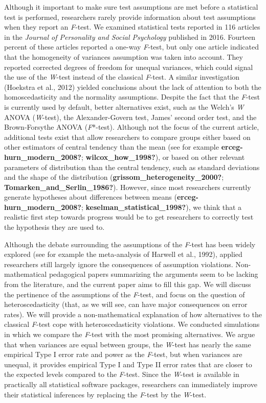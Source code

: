 \documentclass[
  english,
  man]{apa6}
\begin{document}
Although it important to make sure test assumptions are met before a statistical test is performed, researchers rarely provide information about test assumptions when they report an \emph{F}-test. We examined statistical tests reported in 116 articles in the \emph{Journal of Personality and Social Psychology} published in 2016. Fourteen percent of these articles reported a one-way \emph{F}-test, but only one article indicated that the homogeneity of variances assumption was taken into account. They reported corrected degrees of freedom for unequal variances, which could signal the use of the \emph{W}-test instead of the classical \emph{F}-test. A similar investigation (Hoekstra et al., 2012) yielded conclusions about the lack of attention to both the homoscedasticity and the normality assumptions. Despite the fact that the \emph{F}-test is currently used by default, better alternatives exist, such as the Welch's \emph{W} ANOVA (\emph{W}-test), the Alexander-Govern test, James' second order test, and the Brown-Forsythe ANOVA (\emph{F}*-test). Although not the focus of the current article, additional tests exist that allow researchers to compare groups either based on other estimators of central tendency than the mean (see for example \textbf{erceg-hurn\_modern\_2008?}; \textbf{wilcox\_how\_1998?}), or based on other relevant parameters of distribution than the central tendency, such as standard deviations and the shape of the distribution (\textbf{grissom\_heterogeneity\_2000?}; \textbf{Tomarken\_and\_Serlin\_1986?}). However, since most researchers currently generate hypotheses about differences between means (\textbf{erceg-hurn\_modern\_2008?}; \textbf{keselman\_statistical\_1998?}), we think that a realistic first step towards progress would be to get researchers to correctly test the hypothesis they are used to.

Although the debate surrounding the assumptions of the \emph{F}-test has been widely explored (see for example the meta-analysis of Harwell et al., 1992), applied researchers still largely ignore the consequences of assumption violations. Non-mathematical pedagogical papers summarizing the arguments seem to be lacking from the literature, and the current paper aims to fill this gap. We will discuss the pertinence of the assumptions of the \emph{F}-test, and focus on the question of heteroscedasticity (that, as we will see, can have major consequences on error rates). We will provide a non-mathematical explanation of how alternatives to the classical \emph{F}-test cope with heteroscedasticity violations. We conducted simulations in which we compare the \emph{F}-test with the most promising alternatives. We argue that when variances are equal between groups, the \emph{W}-test has nearly the same empirical Type I error rate and power as the \emph{F}-test, but when variances are unequal, it provides empirical Type I and Type II error rates that are closer to the expected levels compared to the \emph{F}-test. Since the \emph{W}-test is available in practically all statistical software packages, researchers can immediately improve their statistical inferences by replacing the \emph{F}-test by the \emph{W}-test.
\end{document}
